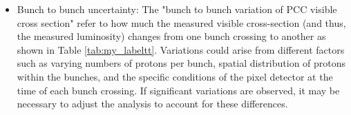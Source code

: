 \begin{itemize}
\begin{itemize}

\end{itemize}


\item Bunch to bunch uncertainty: The "bunch to bunch variation of PCC visible cross section" refer to how much the measured visible cross-section (and thus, the measured luminosity) changes from one bunch crossing to another as shown in Table \ref{tab:my_labeltt}. Variations could arise from different factors such as varying numbers of protons per bunch, spatial distribution of protons within the bunches, and the specific conditions of the pixel detector at the time of each bunch crossing. %
If significant variations are observed, it may be necessary to adjust the analysis to account for these differences. 



\end{itemize}

